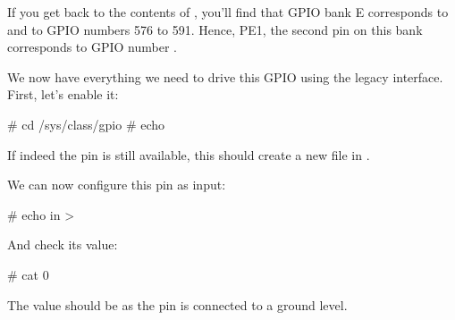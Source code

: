 If you get back to the contents of , you'll
find that GPIO bank E corresponds to  and to GPIO
numbers 576 to 591. Hence, PE1, the second pin on this bank corresponds to
GPIO number \gpionum.

We now have everything we need to drive this GPIO using the legacy
interface. First, let's enable it:

\begin{bashinput}
# cd /sys/class/gpio
# echo %
\end{bashinput}

If indeed the pin is still available, this should create a new
 file in .

We can now configure this pin as input:

\begin{bashinput}
# echo in > %
\end{bashinput}

And check its value:

\begin{bashinput}
# cat %
0
\end{bashinput}

The value should be  as the pin is connected to a ground level.

